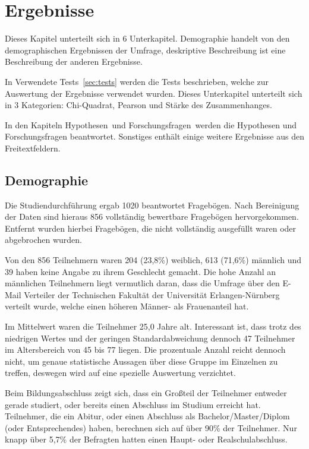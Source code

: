 %
% 

\chapter{Ergebnisse}

Dieses Kapitel unterteilt sich in 6 Unterkapitel. Demographie handelt von den demographischen Ergebnissen der Umfrage, deskriptive Beschreibung ist eine Beschreibung der anderen Ergebnisse.

In \glqq Verwendete Tests\grqq\ \ref{sec:tests} werden die Tests beschrieben, welche zur Auswertung der Ergebnisse verwendet wurden. Dieses Unterkapitel unterteilt sich in 3 Kategorien: Chi-Quadrat, Pearson und Stärke des Zusammenhanges.

In den Kapiteln \glqq Hypothesen\grqq\ und \glqq Forschungsfragen\grqq\ werden die Hypothesen und Forschungsfragen beantwortet. Sonstiges enthält einige weitere Ergebnisse aus den Freitextfeldern.


\section{Demographie}
\label{sec:demo}
Die Studiendurchführung ergab 1020 beantwortet Fragebögen. Nach Bereinigung der Daten sind hieraus 856 vollständig bewertbare Fragebögen hervorgekommen. Entfernt wurden hierbei Fragebögen, die nicht vollständig ausgefüllt waren oder abgebrochen wurden.

Von den 856 Teilnehmern waren 204 (23,8\%) weiblich, 613 (71,6\%) männlich und 39 haben keine Angabe zu ihrem Geschlecht gemacht. Die hohe Anzahl an männlichen Teilnehmern liegt vermutlich daran, dass die Umfrage über den E-Mail Verteiler der Technischen Fakultät der Universität Erlangen-Nürnberg verteilt wurde, welche einen höheren Männer- als Frauenanteil hat.

Im Mittelwert waren die Teilnehmer 25,0 Jahre alt. Interessant ist, dass trotz des niedrigen Wertes und der geringen Standardabweichung dennoch 47 Teilnehmer im Altersbereich von 45 bis 77 liegen. Die prozentuale Anzahl reicht dennoch nicht, um genaue statistische Aussagen über diese Gruppe im Einzelnen zu treffen, deswegen wird auf eine spezielle Auswertung verzichtet.

Beim Bildungsabschluss zeigt sich, dass ein Großteil der Teilnehmer entweder gerade studiert, oder bereits einen Abschluss im Studium erreicht hat. Teilnehmer, die ein Abitur, oder einen Abschluss als Bachelor/Master/Diplom (oder Entsprechendes) haben, berechnen sich auf über 90\% der Teilnehmer. Nur knapp über 5,7\% der Befragten hatten einen Haupt- oder Realschulabschluss.

